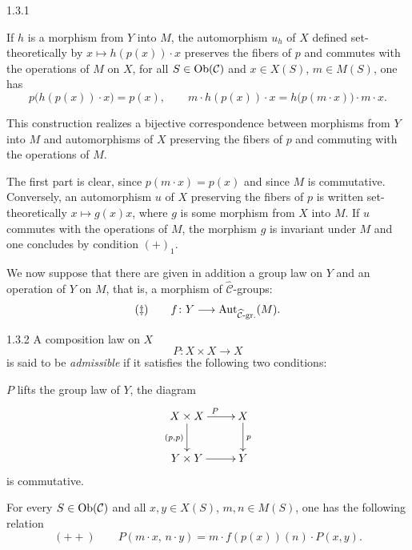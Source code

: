 \begin{lemma}{1.3.1}
\label{III.1.3.1}
\begin{enumeratei}
\item If \(h\) is a morphism from \(Y\) into \(M\), the automorphism \(u_{h}\)
of \(X\) defined set-theoretically by \(x\mapsto h(p(x))\cdot x\) preserves
the fibers of \(p\) and commutes with the operations of \(M\) on
\(X\),{\renewcommand{\thefootnote}{(46)}}
\ie for all \(S\in\operatorname{Ob}(\mathcal{C})\) and \(x\in X(S)\), \(m\in M(S)\), one has
\[
p\bigl(h(p(x))\cdot x\bigr)=p(x),
\qquad
m\cdot h(p(x))\cdot x=h\bigl(p(m\cdot x)\bigr)\cdot m\cdot x.
\]
\item This construction realizes a bijective correspondence between
morphisms from \(Y\) into \(M\) and automorphisms of \(X\) preserving the
fibers of \(p\) and commuting with the operations of \(M\).
\end{enumeratei}
\end{lemma}

The first part is clear, since \(p(m\cdot x)=p(x)\) and since \(M\) is
commutative.
Conversely, an automorphism \(u\) of \(X\) preserving the fibers of \(p\) is
written set-theoretically \(x\mapsto g(x)x\), where \(g\) is some morphism
from \(X\) into \(M\). If \(u\) commutes with the operations of \(M\), the
morphism \(g\) is invariant under
\(M\){\renewcommand{\thefootnote}{(47)}}
and one concludes by condition \((+)_1\).

We now suppose that there are given in addition a group law on \(Y\) and an
operation of \(Y\) on \(M\), that is, a morphism of
\(\widehat{\mathcal{C}}\)-groups:
\[
(\ddagger)\qquad
f\colon Y\longrightarrow\operatorname{Aut}_{\widehat{\mathcal{C}}\textup{-gr.}}(M).
\]

\begin{definition}{1.3.2}
\label{III.1.3.2}
A composition law on \(X\)
\[
P\colon X\times X\longrightarrow X
\]
is said to be \emph{admissible} if it satisfies the following two
conditions:
\begin{enumeratei}
\item \(P\) lifts the group law of \(Y\), \ie the diagram
\[
\xymatrix{
X\times X \ar[r]^{P} \ar[d]_{(p,p)} & X \ar[d]^{p} \\
Y\times Y \ar[r] & Y
}
\]
is commutative.
\item For every \(S\in\operatorname{Ob}(\mathcal{C})\) and all \(x,y\in X(S)\),
\(m,n\in M(S)\), one has the following relation
\[
(++)\qquad
P(m\cdot x,\, n\cdot y)=m\cdot f(p(x))(n)\cdot P(x,y).
\]
\end{enumeratei}
\end{definition}

